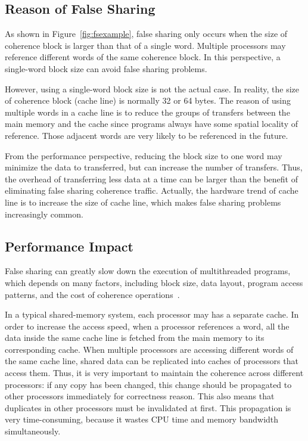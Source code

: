 
\subsection{Reason of False Sharing}

As shown in Figure~\ref{fig:fsexample}, false sharing only occurs when the size of coherence block is larger than that of a single word. Multiple processors may reference different words of the same coherence block. In this perspective, a single-word block size can avoid false sharing problems. 

However, using a single-word block size is not the actual case. In reality, the size of coherence block (cache line) is normally 32 or 64 bytes. The reason of using multiple words in a cache line is to reduce the groups of transfers between the main memory and the cache since programs always have some spatial locality of reference. Those adjacent words are very likely to be referenced in the future.

From the performance perspective, reducing the block size to one word may minimize the data to transferred, but can increase the number of transfers. Thus, the overhead of transferring less data at a time can be larger than the benefit of eliminating false sharing coherence traffic. Actually, the hardware trend of cache line is to increase the size of cache line, which makes false sharing problems increasingly common. 

\subsection{Performance Impact}
\label{falsesharing}
False sharing can greatly slow down the execution of multithreaded programs, which depends on many factors, including block size, data layout, program access patterns, and the cost of coherence operations~\cite{Bolosky:1993:FSE:1295480.1295483}. 

In a typical shared-memory system, each processor may has a separate cache. In order to increase the access speed, when a processor references a word, all the data inside the same cache line is fetched from the main memory to its corresponding cache. 
When multiple processors are accessing different words of the same cache line, shared data can be replicated into caches of processors that access them. Thus, it is very important to maintain the coherence across different processors: if any copy has been changed, this change should be propagated to other processors immediately for correctness reason. This also means that duplicates in other processors must be invalidated at first. This propagation is very time-consuming, because it wastes CPU time and memory bandwidth simultaneously. 

